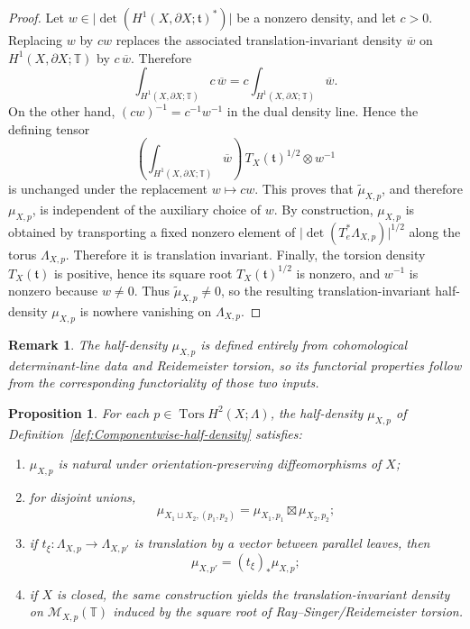 \documentclass[12pt]{amsart}
\numberwithin{equation}{section}
\newtheorem{prop}[theorem]{Proposition}
\newtheorem*{remark}{Remark}
\DeclareMathOperator{\Tors}{Tors}
\begin{document}
\begin{proof}
Let $w\in \bigl|\det(H^1(X,\partial X;\mathfrak t)^*)\bigr|$ be a nonzero density, and let $c>0$. Replacing $w$ by $cw$ replaces the associated
translation-invariant density $\overline{w}$ on $H^1(X,\partial X;\mathbb T)$ by $c\,\overline{w}$.
Therefore
\[
\int_{H^1(X,\partial X;\mathbb T)} c\,\overline{w}
=
c\int_{H^1(X,\partial X;\mathbb T)} \overline{w}.
\]
On the other hand, $(cw)^{-1}=c^{-1}w^{-1}$
in the dual density line. Hence the defining tensor
\[
\left(\int_{H^1(X,\partial X;\mathbb T)} \overline{w}\right)\,
T_X(\mathfrak t)^{1/2}\otimes w^{-1}
\]
is unchanged under the replacement $w\mapsto cw$. This proves that
$\widetilde{\mu}_{X,p}$, and therefore $\mu_{X,p}$, is independent of the auxiliary choice of $w$. By construction, $\mu_{X,p}$ is obtained by transporting a fixed nonzero element of
$\bigl|\det(T_e^*\Lambda_{X,p})\bigr|^{1/2}$ along the torus $\Lambda_{X,p}$. Therefore it is
translation invariant. Finally, the torsion density $T_X(\mathfrak t)$ is positive, hence its square root
$T_X(\mathfrak t)^{1/2}$ is nonzero, and $w^{-1}$ is nonzero because $w\neq 0$. Thus
$\widetilde{\mu}_{X,p}\neq 0$, so the resulting translation-invariant half-density $\mu_{X,p}$ is nowhere vanishing on $\Lambda_{X,p}$.

\end{proof}

\begin{remark}
The half-density $\mu_{X,p}$ is defined entirely from cohomological determinant-line data and Reidemeister
torsion, so its functorial properties follow from the corresponding functoriality of those two inputs.
\end{remark}

\begin{prop}
\label{prop:Componentwise-toral-torsion-half-density}
For each $p\in\Tors H^2(X;\Lambda)$, the half-density $\mu_{X,p}$ of
Definition~\ref{def:Componentwise-half-density} satisfies:

\begin{enumerate}
\item[\textup{(i)}]
$\mu_{X,p}$ is natural under orientation-preserving diffeomorphisms of $X$;

\item[\textup{(ii)}]
for disjoint unions,
\[
\mu_{X_1\sqcup X_2,(p_1,p_2)}
=
\mu_{X_1,p_1}\boxtimes \mu_{X_2,p_2};
\]

\item[\textup{(iii)}]
if $t_\xi:\Lambda_{X,p}\to\Lambda_{X,p'}$ is translation by a vector between
parallel leaves, then
\[
\mu_{X,p'}=(t_\xi)_*\mu_{X,p};
\]

\item[\textup{(iv)}]
if $X$ is closed, the same construction yields the translation-invariant
density on $\mathcal M_{X,p}(\mathbb T)$ induced by the square root of
Ray--Singer/Reidemeister torsion.
\end{enumerate}
\end{prop}
\end{document}
